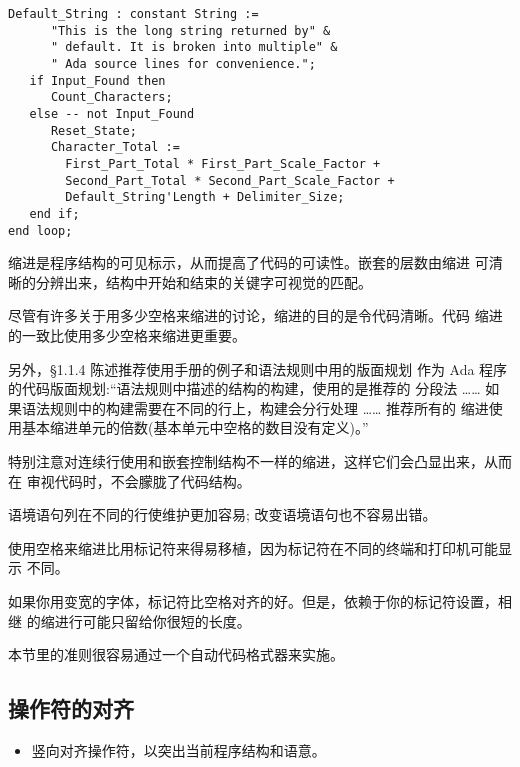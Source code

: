 \begin{blockindent}
\noindent
\begin{lstlisting}
Default_String : constant String :=
      "This is the long string returned by" &
      " default. It is broken into multiple" &
      " Ada source lines for convenience.";
   if Input_Found then
      Count_Characters;
   else -- not Input_Found
      Reset_State;
      Character_Total :=
        First_Part_Total * First_Part_Scale_Factor +
        Second_Part_Total * Second_Part_Scale_Factor +
        Default_String'Length + Delimiter_Size;
   end if;
end loop;
\end{lstlisting}
\end{blockindent}

\begin{blockindent}
缩进是程序结构的可见标示，从而提高了代码的可读性。嵌套的层数由缩进
可清晰的分辨出来，结构中开始和结束的关键字可视觉的匹配。

尽管有许多关于用多少空格来缩进的讨论，缩进的目的是令代码清晰。代码
缩进的一致比使用多少空格来缩进更重要。

另外，\cite{arm95}\S{}1.1.4 陈述推荐使用手册的例子和语法规则中用的版面规划
作为 Ada 程序的代码版面规划:``语法规则中描述的结构的构建，使用的是推荐的
分段法 …… 如果语法规则中的构建需要在不同的行上，构建会分行处理 …… 推荐所有的
缩进使用基本缩进单元的倍数(基本单元中空格的数目没有定义)。''

特别注意对连续行使用和嵌套控制结构不一样的缩进，这样它们会凸显出来，从而在
审视代码时，不会朦胧了代码结构。

语境语句列在不同的行使维护更加容易; 改变语境语句也不容易出错。

使用空格来缩进比用标记符来得易移植，因为标记符在不同的终端和打印机可能显示
不同。
\end{blockindent}

\begin{blockindent}
如果你用变宽的字体，标记符比空格对齐的好。但是，依赖于你的标记符设置，相继
的缩进行可能只留给你很短的长度。
\end{blockindent}

\begin{blockindent}
本节里的准则很容易通过一个自动代码格式器来实施。
\end{blockindent}

\subsection{操作符的对齐}
\begin{itemize}
    \item 竖向对齐操作符，以突出当前程序结构和语意。
\end{itemize}

